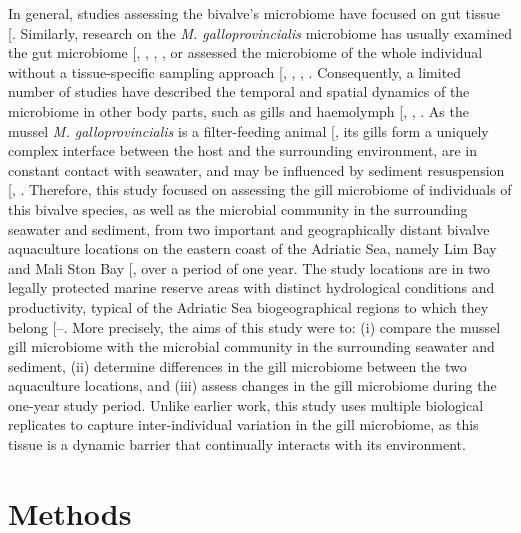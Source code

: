 \documentclass[
  12 pt,
]{article}
\begin{document}
In general, studies assessing the bivalve's microbiome have focused on gut tissue {[}\citeproc{ref-Salloum2025}{2}{]}. Similarly, research on the \emph{M. galloprovincialis} microbiome has usually examined the gut microbiome {[}, , , , \citeproc{ref-Wathsala2021}{30}{]} or assessed the microbiome of the whole individual without a tissue-specific sampling approach {[}, , , \citeproc{ref-Schoinas2023}{29}{]}. Consequently, a limited number of studies have described the temporal and spatial dynamics of the microbiome in other body parts, such as gills and haemolymph {[}, , \citeproc{ref-Zardinoni2024}{31}{]}. As the mussel \emph{M. galloprovincialis} is a filter-feeding animal {[}\citeproc{ref-Gosling2003a}{37}{]}, its gills form a uniquely complex interface between the host and the surrounding environment, are in constant contact with seawater, and may be influenced by sediment resuspension {[}, \citeproc{ref-Ward2004}{39}{]}. Therefore, this study focused on assessing the gill microbiome of individuals of this bivalve species, as well as the microbial community in the surrounding seawater and sediment, from two important and geographically distant bivalve aquaculture locations on the eastern coast of the Adriatic Sea, namely Lim Bay and Mali Ston Bay {[}\citeproc{ref-BratosCetinic2024}{40}{]}, over a period of one year. The study locations are in two legally protected marine reserve areas with distinct hydrological conditions and productivity, typical of the Adriatic Sea biogeographical regions to which they belong {[}--\citeproc{ref-Skejic2015}{44}{]}. More precisely, the aims of this study were to: (i) compare the mussel gill microbiome with the microbial community in the surrounding seawater and sediment, (ii) determine differences in the gill microbiome between the two aquaculture locations, and (iii) assess changes in the gill microbiome during the one-year study period. Unlike earlier work, this study uses multiple biological replicates to capture inter-individual variation in the gill microbiome, as this tissue is a dynamic barrier that continually interacts with its environment.
\newpage

\section{Methods}\label{methods}
\end{document}
